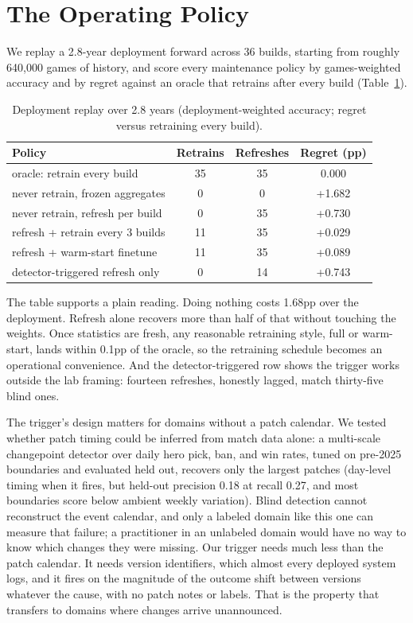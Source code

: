 \documentclass[journal]{IEEEtran}
\begin{document}
\section{The Operating Policy}
\label{sec:operating}

We replay a 2.8-year deployment forward across 36 builds, starting from
roughly 640{,}000 games of history, and score every maintenance policy
by games-weighted accuracy and by regret against an oracle that retrains
after every build (Table~\ref{tab:regret}).

\begin{table}[t]
\caption{Deployment replay over 2.8 years (deployment-weighted accuracy;
regret versus retraining every build).}
\label{tab:regret}
\centering
\footnotesize
\setlength{\tabcolsep}{4pt}
\begin{tabular}{lccc}
\toprule
Policy & Retrains & Refreshes & Regret (pp) \\
\midrule
oracle: retrain every build & 35 & 35 & 0.000 \\
never retrain, frozen aggregates & 0 & 0 & +1.682 \\
never retrain, refresh per build & 0 & 35 & +0.730 \\
refresh + retrain every 3 builds & 11 & 35 & +0.029 \\
refresh + warm-start finetune & 11 & 35 & +0.089 \\
detector-triggered refresh only & 0 & 14 & +0.743 \\
\bottomrule
\end{tabular}
\end{table}

The table supports a plain reading. Doing nothing costs 1.68pp over the
deployment. Refresh alone recovers more than half of that without
touching the weights. Once statistics are fresh, any reasonable
retraining style, full or warm-start, lands within 0.1pp of the oracle,
so the retraining schedule becomes an operational convenience. And the detector-triggered row shows the trigger
works outside the lab framing: fourteen refreshes, honestly lagged,
match thirty-five blind ones.

The trigger's design matters for domains without a patch calendar. We
tested whether patch timing could be inferred from match data alone: a
multi-scale changepoint detector over daily hero pick, ban, and win
rates, tuned on pre-2025 boundaries and evaluated held out, recovers
only the largest patches (day-level timing when it fires, but held-out
precision 0.18 at recall 0.27, and most boundaries score below ambient
weekly variation). Blind detection cannot reconstruct the event
calendar, and only a labeled domain like this one can measure that
failure; a practitioner in an unlabeled domain would have no way to know
which changes they were missing. Our trigger needs much less than the
patch calendar. It needs version identifiers, which almost every
deployed system logs, and it fires on the magnitude of the outcome shift
between versions whatever the cause, with no patch notes or labels. That
is the property that transfers to domains where changes arrive
unannounced.
\end{document}
